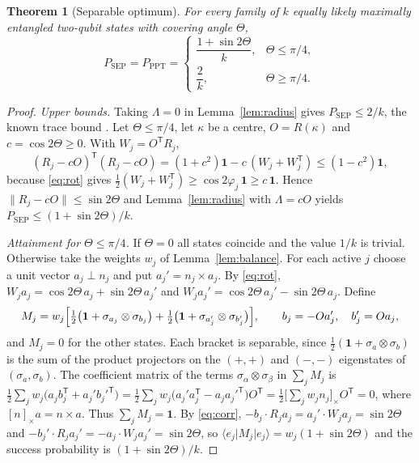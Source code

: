 \documentclass[11pt,a4paper]{article}
\newtheorem{theorem}{Theorem}
\theoremstyle{definition}
\theoremstyle{plain}
\newcommand{\ket}[1]{\lvert#1\rangle}
\newcommand{\bra}[1]{\langle#1\rvert}
\newcommand{\norm}[1]{\lVert#1\rVert}
\newcommand{\one}{\mathbf{1}}
\newcommand{\T}{\mathsf{T}}
\newcommand{\Psep}{P_{\mathrm{SEP}}}
\newcommand{\Pppt}{P_{\mathrm{PPT}}}
\begin{document}
\begin{theorem}[Separable optimum]\label{thm:sep}
For every family of $k$ equally likely maximally entangled two-qubit states
with covering angle $\Theta$,
\[
\Psep=\Pppt=
\begin{cases}
\dfrac{1+\sin2\Theta}{k},&\Theta\le\pi/4,\\[2ex]
\dfrac2k,&\Theta\ge\pi/4 .
\end{cases}
\]
\end{theorem}
\begin{proof}
\emph{Upper bounds.} Taking $\Lambda=0$ in Lemma~\ref{lem:radius} gives
$\Psep\le2/k$, the known trace bound
\cite{Nathanson2005,BandyopadhyayNathanson2013}. Let $\Theta\le\pi/4$, let $\kappa$ be a centre,
$O=R(\kappa)$ and $c=\cos2\Theta\ge0$. With $W_j=O^\T R_j$,
\[
(R_j-cO)^\T(R_j-cO)=(1+c^2)\one-c\,(W_j+W_j^\T)\le(1-c^2)\one ,
\]
because \eqref{eq:rot} gives
$\tfrac12(W_j+W_j^\T)\ge\cos2\varphi_j\,\one\ge c\,\one$. Hence
$\norm{R_j-cO}\le\sin2\Theta$ and Lemma~\ref{lem:radius} with $\Lambda=cO$
yields $\Psep\le(1+\sin2\Theta)/k$.

\emph{Attainment for $\Theta\le\pi/4$.} If $\Theta=0$ all states coincide and
the value $1/k$ is trivial. Otherwise take the weights $w_j$ of
Lemma~\ref{lem:balance}. For each active $j$ choose a unit vector
$a_j\perp n_j$ and put $a_j'=n_j\times a_j$. By \eqref{eq:rot},
$W_ja_j=\cos2\Theta\,a_j+\sin2\Theta\,a_j'$ and
$W_ja_j'=\cos2\Theta\,a_j'-\sin2\Theta\,a_j$. Define
\[
M_j=w_j\Bigl[\tfrac12\bigl(\one+\sigma_{a_j}\otimes\sigma_{b_j}\bigr)
+\tfrac12\bigl(\one+\sigma_{a_j'}\otimes\sigma_{b_j'}\bigr)\Bigr],
\qquad b_j=-Oa_j',\quad b_j'=Oa_j ,
\]
and $M_j=0$ for the other states. Each bracket is separable, since
$\tfrac12(\one+\sigma_a\otimes\sigma_b)$ is the sum of the product projectors
on the $(+,+)$ and $(-,-)$ eigenstates of $(\sigma_a,\sigma_b)$. The
coefficient matrix of the terms $\sigma_\alpha\otimes\sigma_\beta$ in
$\sum_jM_j$ is
$\tfrac12\sum_jw_j\bigl(a_jb_j^\T+a_j'b_j'^\T\bigr)
=\tfrac12\sum_jw_j\bigl(a_j'a_j^\T-a_ja_j'^\T\bigr)O^\T
=\tfrac12\bigl[\sum_jw_jn_j\bigr]_\times O^\T=0$,
where $[n]_\times a=n\times a$. Thus $\sum_jM_j=\one$. By \eqref{eq:corr},
$-b_j\cdot R_ja_j=a_j'\cdot W_ja_j=\sin2\Theta$ and
$-b_j'\cdot R_ja_j'=-a_j\cdot W_ja_j'=\sin2\Theta$, so
$\bra{e_j}M_j\ket{e_j}=w_j(1+\sin2\Theta)$ and the success probability is
$(1+\sin2\Theta)/k$.


\end{proof}
\end{document}
